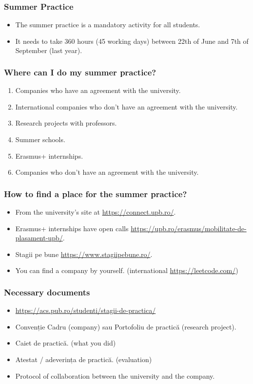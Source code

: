 \begin{frame}
\frametitle{Summer Practice}
\begin{itemize}
    \item The summer practice is a mandatory activity for all students.
    \item It needs to take 360 hours (45 working days) between 22th of June and 7th of September (last year).
\end{itemize}
\end{frame}

\begin{frame}
\frametitle{Where can I do my summer practice?}
\begin{enumerate}
    \item Companies who have an agreement with the university.
    \item International companies who don't have an agreement with the university.
    \item Research projects with professors.
    \item Summer schools.
    \item Erasmus+ internships.
    \item Companies who don't have an agreement with the university.
\end{enumerate}
\end{frame}

\begin{frame}
\frametitle{How to find a place for the summer practice?}
\begin{itemize}
    \item From the university's site at \url{https://connect.upb.ro/}.
    \item Erasmus+ internships have open calls \url{https://upb.ro/erasmus/mobilitate-de-plasament-upb/}.
    \item Stagii pe bune \url{https://www.stagiipebune.ro/}.
    \item You can find a company by yourself. (international \url{https://leetcode.com/})
\end{itemize}
\end{frame}

\begin{frame}
\frametitle{Necessary documents}
\begin{itemize}
    \item \url{https://acs.pub.ro/studenti/stagii-de-practica/}
    \item Convenție Cadru (company) sau Portofoliu de practică (research project).
    \item Caiet de practică. (what you did)
    \item Atestat / adeverința de practică. (evaluation)
    \item Protocol of collaboration  between the university and the company.
\end{itemize}
\end{frame}
